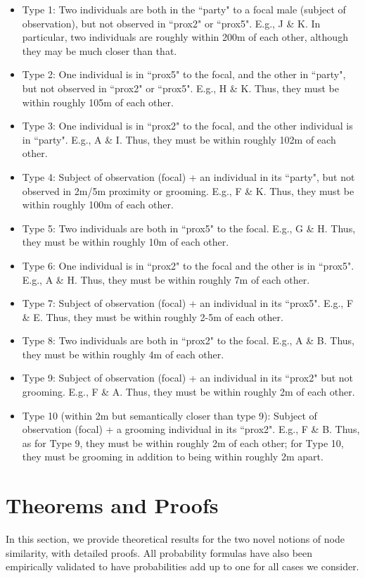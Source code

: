 \documentclass{article}
\theoremstyle{plain}
\theoremstyle{definition}
\theoremstyle{remark}
\begin{document}
\begin{itemize}
    \item Type 1: Two individuals are both in the ``party" to a focal male (subject of observation), but not observed in ``prox2" or ``prox5". E.g., J \& K. In particular, two individuals are roughly within 200m of each other, although they may be much closer than that.
    \item Type 2: One individual is in ``prox5" to the focal, and the other in ``party", but not observed in ``prox2" or ``prox5". E.g., H \& K. Thus, they must be within roughly 105m of each other.
    \item Type 3:
    One individual is in ``prox2" to the focal, and the other individual is in ``party". E.g., A \& I. Thus, they must be within roughly 102m of each other.
    \item Type 4: Subject of observation (focal) + an individual in its ``party", but not observed in 2m/5m proximity or grooming. E.g., F \& K. Thus, they must be within roughly 100m of each other.
    \item Type 5: Two individuals are both in ``prox5" to the focal. E.g., G \& H. Thus, they must be within roughly 10m of each other.
    \item Type 6: One individual is in ``prox2" to the focal and the other is in ``prox5". E.g., A \& H. Thus, they must be within roughly 7m of each other.
    \item Type 7: Subject of observation (focal) + an individual in its ``prox5". E.g., F \& E. Thus, they must be within roughly 2-5m of each other.
    \item Type 8: Two individuals are both in ``prox2" to the focal. E.g., A \& B. Thus, they must be within roughly 4m of each other.
    \item Type 9: Subject of observation (focal) + an individual in its ``prox2" but not grooming. E.g., F \& A. Thus, they must be within roughly 2m of each other.
    \item Type 10 (within 2m but semantically closer than type 9): Subject of observation (focal) + a grooming individual in its ``prox2". E.g., F \& B. Thus, as for Type 9, they must be within roughly 2m of each other; for Type 10, they must be grooming in addition to being within roughly 2m apart.
\end{itemize}

\section{Theorems and Proofs}\label{app:proofs}
In this section, we provide theoretical results for the two novel notions of node similarity, with detailed proofs. All probability formulas have also been empirically validated to have probabilities add up to one for all cases we consider.
\end{document}
